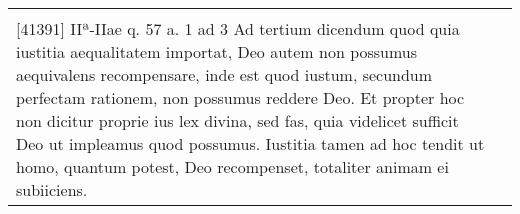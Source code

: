 \documentclass[10pt]{jsarticle} %
\begin{document}
\begin{longtable}{p{21em}p{21em}}
&


\\



[41391] IIª-IIae q. 57 a. 1 ad 3 Ad tertium dicendum quod quia iustitia aequalitatem importat, Deo autem non possumus aequivalens recompensare, inde est quod iustum, secundum perfectam rationem, non possumus reddere Deo. Et propter hoc non dicitur proprie ius lex divina, sed fas, quia videlicet sufficit Deo ut impleamus quod possumus. Iustitia tamen ad hoc tendit ut homo, quantum potest, Deo recompenset, totaliter animam ei subiiciens.

&



\end{longtable}
\newpage
\end{document}
